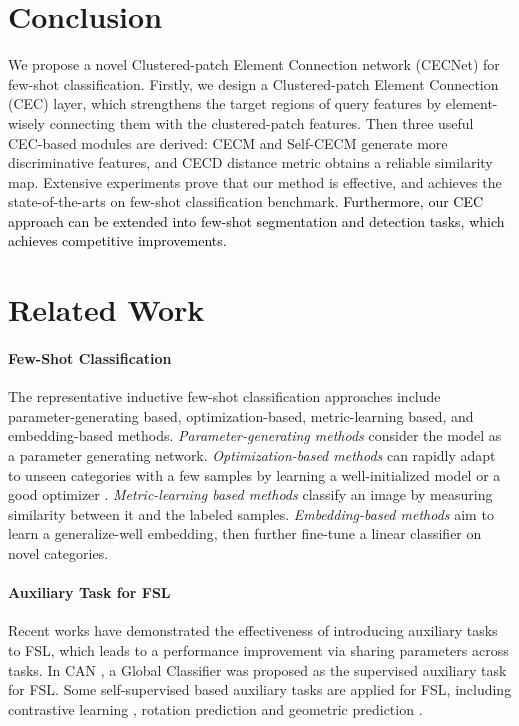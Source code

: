 \documentclass{article}
\newcommand{\jinxiang}[1]{\textcolor{black}{#1}}
\begin{document}
\section{Conclusion}
We propose a novel Clustered-patch Element Connection network (CECNet) for few-shot classification. Firstly, we design a Clustered-patch Element Connection (CEC) layer, which strengthens the target regions of query features by element-wisely connecting them with the clustered-patch features.
Then three useful CEC-based modules are derived: CECM and Self-CECM generate more discriminative features, and CECD distance metric obtains a reliable similarity map.
Extensive experiments prove that our method is effective, and achieves the state-of-the-arts on few-shot classification benchmark.
\jinxiang{Furthermore, our CEC approach can be extended into few-shot segmentation and detection tasks, which achieves competitive improvements.}



\appendix

\section{Related Work}
\paragraph{Few-Shot Classification}
The representative inductive few-shot classification approaches include parameter-generating based, optimization-based, metric-learning based, and embedding-based methods.
\textit{Parameter-generating methods} \cite{munkhdalai2017meta,gidaris2019generating} consider the model as a parameter generating network. \textit{Optimization-based methods} can rapidly adapt to unseen categories with a few samples by learning a well-initialized model \cite{nichol2018first,finn2017model} or a good optimizer \cite{marcin2018learn,ravi2016optimization}. \textit{Metric-learning based methods} \cite{vinyals2016matching,snell2017prototypical,xu2021learning,hou2019cross} classify an image by measuring similarity between it and the labeled samples. \textit{Embedding-based methods} \cite{tian2020rethinking,rizve2021exploring,zhengyu2021pareto} aim to learn a generalize-well embedding, then further fine-tune a linear classifier on novel categories.


\paragraph{Auxiliary Task for FSL}
Recent works have demonstrated the effectiveness of introducing auxiliary tasks to FSL, which leads to a performance improvement via sharing parameters across tasks. In CAN \cite{hou2019cross}, a Global Classifier was proposed as the supervised auxiliary task for FSL. Some self-supervised based auxiliary tasks are applied for FSL, including contrastive learning \cite{liu2021learning}, rotation prediction \cite{su2020does} and geometric prediction \cite{rizve2021exploring}.
\end{document}
